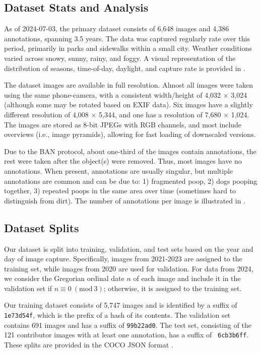 \documentclass{article}
\begin{document}
\subsection{Dataset Stats and Analysis}
\label{subsec:datastat}

As of 2024-07-03, the primary dataset consists of 6,648 images and 4,386 annotations, spanning 3.5 years.
The data was captured regularly rate over this period, primarily in parks and sidewalks within
  a small city.
Weather conditions varied across snowy, sunny, rainy, and foggy.
A visual representation of the distribution of seasons, time-of-day, daylight, and capture rate is provided
  in .


The dataset images are available in full resolution.
Almost all images were taken using the same phone-camera, with a consistent width/height of 4,032
  $\times$ 3,024 (although some may be rotated based on EXIF data).
Six images have a slightly different resolution of 4,008 $\times$ 5,344, and one has a resolution of 7,680
  $\times$ 1,024.
The images are stored as 8-bit JPEGs with RGB channels, and most include overviews (i.e., image pyramids),
  allowing for fast loading of downscaled versions.


Due to the BAN protocol, about one-third of the images contain
annotations, the rest were taken after the object(s) were removed.  Thus, most
images have no annotations. When present, annotations are usually singular, but
multiple annotations are common and can be due to:
1) fragmented poop,
2) dogs pooping together,
3) repeated poops in the same area over time (sometimes hard to distinguish from dirt).
The number of annotations per image is illustrated in .


\subsection{Dataset Splits}

Our dataset is split into training, validation, and test sets based on the year and day of image capture.
Specifically, images from 2021-2023 are assigned to the training set, while images from 2020 are
  used for validation.
For data from 2024, we consider the Gregorian ordinal date $n$ of each image and include it in the validation set if
$n \equiv 0 \ (\textrm{mod}\ 3)$; otherwise, it is assigned to the training set.

Our training dataset consists of 5,747 images and is identified by a suffix of {\tt 1e73d54f}, which is the
  prefix of a hash of its contents.
The validation set contains 691 images and has a suffix of {\tt 99b22ad0}.
The test set, consisting of the 121 contributor images with at least one annotation, has a suffix of {\tt
  6cb3b6ff}.
These splits are provided in the COCO JSON format \cite{lin_microsoft_2014}.
\end{document}

